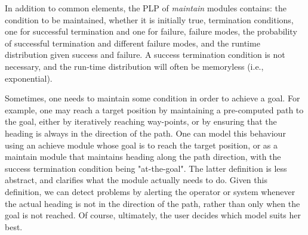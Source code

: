 \documentclass[ 5p, 12pt, times, twocolumn, sort&compress ]{elsarticle}
\begin{document}
In addition to common elements, the PLP of {\em maintain} modules contains: the condition to be maintained,
whether it is initially true, termination conditions, one for successful termination and one for failure,
failure modes, the probability of successful termination and different failure modes, and the runtime distribution given success and failure.
A success termination condition is not necessary, and the run-time distribution will often be memoryless (i.e., exponential).
%
%
%
%
%
%
%
%
%
%

Sometimes, one needs to maintain some condition in order to achieve a goal. For example, one may reach a 
target position by maintaining a pre-computed path to the goal, either by iteratively reaching way-points,
or by ensuring that the heading is always in the direction of the path. One can model this behaviour using an achieve module
whose goal is to reach the target position, or as a maintain module that maintains heading along the path direction,
with the success termination condition being "at-the-goal". The latter definition is less abstract, and clarifies what the module actually needs
to do. Given this definition, we can detect problems by alerting the operator or system whenever the actual heading is not in the direction of the path, rather than only when the goal is not reached. Of course, ultimately, the user decides which model suits her best.
\end{document}
